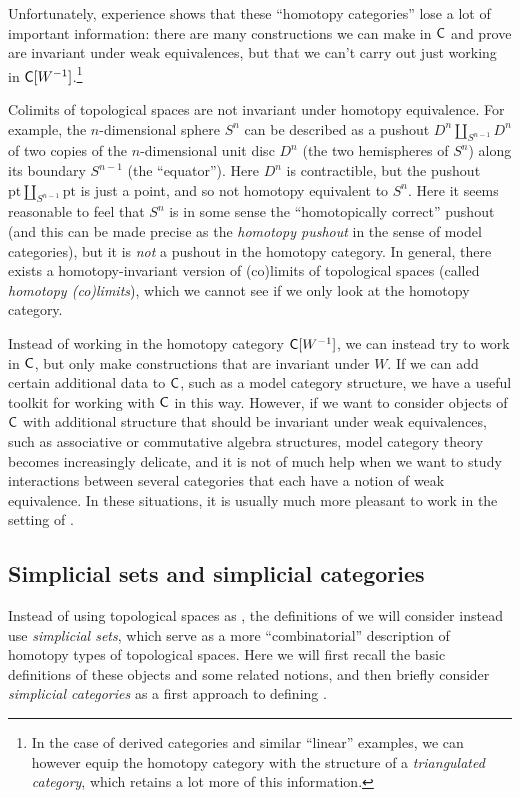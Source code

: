 \documentclass[a4paper,11pt]{article}
\begin{document}
Unfortunately, experience shows that these ``homotopy categories''
lose a lot of important information: there are many constructions we can
make in $\textup{\textsf{C}}$ and prove are invariant under weak equivalences, but
that we can't carry out just working in $\textup{\textsf{C}}[W^{-1}]$.\footnote{In the
  case of derived categories and similar ``linear'' examples, we can
  however equip the homotopy category with the structure of a
  \emph{triangulated category}, which retains a lot more of this
  information.} 
\begin{ex}
  Colimits of topological spaces are not invariant under homotopy
  equivalence. For example, the $n$-dimensional sphere $S^{n}$ can be
  described as a pushout $D^{n} \amalg_{S^{n-1}} D^{n}$ of two copies
  of the $n$-dimensional unit disc $D^{n}$ (the two hemispheres of
  $S^{n}$) along its boundary $S^{n-1}$ (the ``equator''). Here
  $D^{n}$ is contractible, but the pushout
  $\mathrm{pt} \amalg_{S^{n-1}} \mathrm{pt}$ is just a point, and so
  not homotopy equivalent to $S^{n}$. Here it seems reasonable to feel
  that $S^{n}$ is in some sense the ``homotopically correct'' pushout
  (and this can be made precise as the \emph{homotopy pushout} in the
  sense of model categories), but it is \emph{not} a pushout in the
  homotopy category. In general, there exists a homotopy-invariant
  version of (co)limits of topological spaces (called \emph{homotopy
    (co)limits}), which we cannot see if we only look at the homotopy
  category.
\end{ex}

Instead of working in the homotopy category $\textup{\textsf{C}}[W^{-1}]$, we can
instead try to work in $\textup{\textsf{C}}$, but only make constructions that are
invariant under $W$. If we can add certain additional data to $\textup{\textsf{C}}$,
such as a model category structure, we have a useful toolkit for
working with $\textup{\textsf{C}}$ in this way. However, if we want to consider
objects of $\textup{\textsf{C}}$ with additional structure that should be invariant
under weak equivalences, such as associative or commutative algebra
structures, model category theory becomes increasingly delicate, and
it is not of much help when we want to study interactions between
several categories that each have a notion of weak equivalence. In
these situations, it is usually much more pleasant to work in the
setting of \icats{}.

\subsection{Simplicial sets and simplicial categories}\label{subsec:simp}
Instead of using topological spaces as \igpds{}, the definitions of
\icats{} we will consider instead use \emph{simplicial sets}, which serve
as a more ``combinatorial'' description of homotopy types of
topological spaces. Here we will first recall the basic definitions of
these objects and some related notions, and then briefly consider
\emph{simplicial categories} as a first approach to defining \icats{}.
\end{document}
